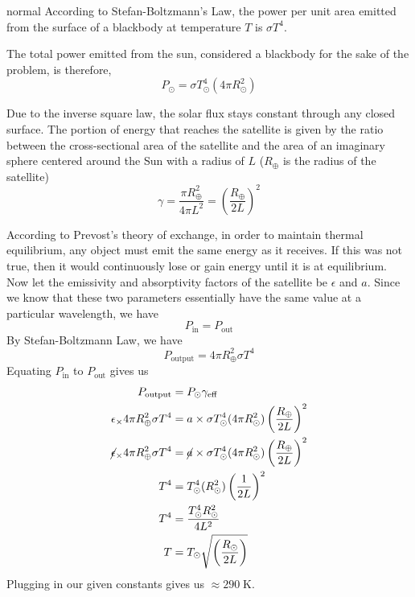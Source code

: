 \begin{solution}{normal}
According to Stefan-Boltzmann's Law, the power per unit area emitted from the surface of a blackbody at temperature $T$ is $\sigma T^4$. 

The total power emitted from the sun, considered a blackbody for the sake of the problem, is therefore,
$$P_\odot=\sigma T_\odot^4 (4\pi R_\odot^2)$$

Due to the inverse square law, the solar flux stays constant through any closed surface. The portion of energy that reaches the satellite is given by the ratio between the cross-sectional area of the satellite and the area of an imaginary sphere centered around the Sun with a radius of $L$ ($R_\oplus$ is the radius of the satellite)
$$
\gamma=
\frac{\pi R_\oplus^2}{4\pi L^2}=
\left(\frac{R_\oplus}{2L}\right)^2$$

According to Prevost's theory of exchange, in order to maintain thermal equilibrium, any object must emit the same energy as it receives. If this was not true, then it would continuously lose or gain energy until it is at equilibrium. Now let the emissivity and absorptivity factors of the satellite be $\epsilon$ and $a$. Since we know that these two parameters essentially have the same value at a particular wavelength, we have
$$P_\text{in} = P_\text{out}$$
By Stefan-Boltzmann Law, we have 
\[P_{\text{output}}=4\pi R_\oplus^2\sigma T^4\]
Equating $P_{\text{in}}$ to $P_{\text{out}}$ gives us
\begin{align*}
P_\text{output} &= P_\odot \gamma_\text{eff}\\
\epsilon_ \times 4\pi R_\oplus^2\sigma T^4 &= 
a \times \sigma T_\odot^4 (4\pi R_\odot^2)\left(\frac{R_\oplus}{2L}\right)^2 \\
\cancel\epsilon_ \times 4\pi R_\oplus^2\sigma T^4 &= 
\cancel a \times \sigma T_\odot^4 (4\pi R_\odot^2)\left(\frac{R_\oplus}{2L}\right)^2 \\
 T^4 &= 
 T_\odot^4 (R_\odot^2)\left(\frac{1}{2L}\right)^2 \\
 T^4 &= \frac{T_\odot^4 R_\odot^2}{4L^2}  \\
 T &= T_\odot \sqrt{\left(\frac{R_\odot}{2L}\right)}\\
\end{align*}
Plugging in our given constants gives us $\approx\boxed{290\;\mathrm{K}}$.

\end{solution}